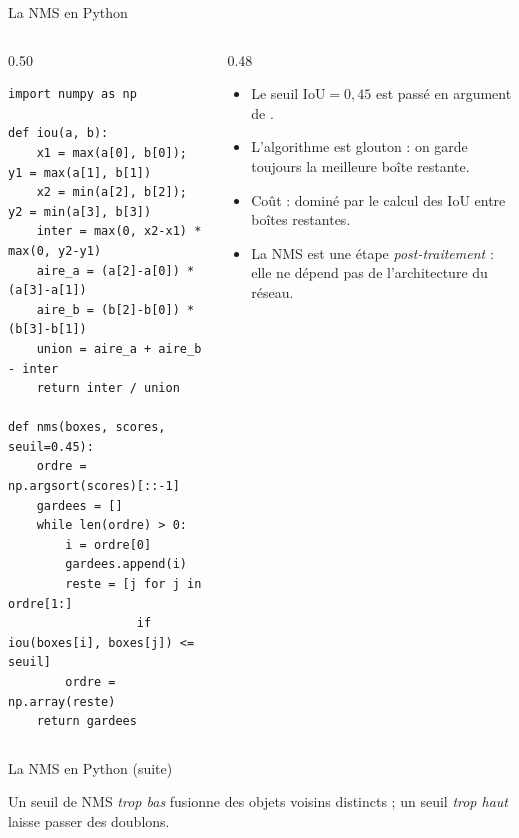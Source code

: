 \begin{frame}[fragile]{La NMS en Python}
\begin{columns}[t]
\begin{column}{0.50\textwidth}
\begin{codebox}
\begin{lstlisting}
import numpy as np

def iou(a, b):
    x1 = max(a[0], b[0]); y1 = max(a[1], b[1])
    x2 = min(a[2], b[2]); y2 = min(a[3], b[3])
    inter = max(0, x2-x1) * max(0, y2-y1)
    aire_a = (a[2]-a[0]) * (a[3]-a[1])
    aire_b = (b[2]-b[0]) * (b[3]-b[1])
    union = aire_a + aire_b - inter
    return inter / union

def nms(boxes, scores, seuil=0.45):
    ordre = np.argsort(scores)[::-1]
    gardees = []
    while len(ordre) > 0:
        i = ordre[0]
        gardees.append(i)
        reste = [j for j in ordre[1:]
                  if iou(boxes[i], boxes[j]) <= seuil]
        ordre = np.array(reste)
    return gardees
\end{lstlisting}
\end{codebox}
\end{column}
\begin{column}{0.48\textwidth}
\begin{itemize}
  \item Le seuil $\mathrm{IoU} = 0{,}45$ est passé en argument de
  .
  \item L'algorithme est glouton : on garde toujours la meilleure boîte
  restante.
  \item Coût : dominé par le calcul des IoU entre boîtes restantes.
  \item La NMS est une étape \emph{post-traitement} : elle ne dépend pas
  de l'architecture du réseau.
\end{itemize}

\end{column}
\end{columns}
\end{frame}
\begin{frame}{La NMS en Python (suite)}
\begin{wbox}
Un seuil de NMS \emph{trop bas} fusionne des objets voisins distincts ; un seuil
\emph{trop haut} laisse passer des doublons.
\end{wbox}
\end{frame}

